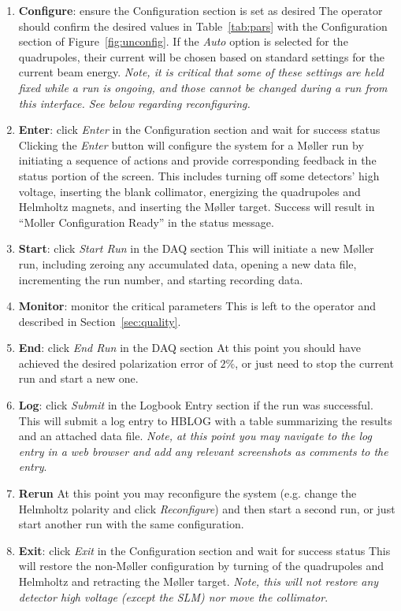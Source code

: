 \documentclass[amsmath,amssymb,notitlepage,12pt]{revtex4}
\begin{document}
\begin{enumerate}
\item {\bf Configure}:  ensure the Configuration section is set as desired
        \subitem
        The operator should confirm the desired values in Table~\ref{tab:pars} with the Configuration section of Figure~\ref{fig:unconfig}.  If the {\em Auto} option is selected for the quadrupoles, their current will be chosen based on standard settings for the current beam energy.  {\em Note, it is critical that some of these settings are held fixed while a run is ongoing, and those cannot be changed during a run from this interface.  See below regarding reconfiguring.}
\item {\bf Enter}: click {\em Enter} in the Configuration section and wait for success status
    \subitem Clicking the {\em Enter} button will configure the system for a M{\o}ller run by initiating a sequence of actions and provide corresponding feedback in the status portion of the screen.  This includes turning off some detectors' high voltage, inserting the blank collimator, energizing the quadrupoles and Helmholtz magnets, and inserting the M{\o}ller target.  Success will result in ``Moller Configuration Ready'' in the status message.
\item {\bf Start}: click {\em Start Run} in the DAQ section
    \subitem This will initiate a new M{\o}ller run, including zeroing any accumulated data, opening a new data file, incrementing the run number, and starting recording data.
\item {\bf Monitor}: monitor the critical parameters
    \subitem This is left to the operator and described in Section~\ref{sec:quality}.
\item {\bf End}: click {\em End Run} in the DAQ section
    \subitem At this point you should have achieved the desired polarization error of $2\%$, or just need to stop the current run and start a new one.
\item {\bf Log}: click {\em Submit} in the Logbook Entry section if the run was successful. 
    \subitem This will submit a log entry to HBLOG with a table summarizing the results and an attached data file. {\em Note, at this point you may navigate to the log entry in a web browser and add any relevant screenshots as comments to the entry}.
\item {\bf Rerun}  At this point you may reconfigure the system (e.g. change the Helmholtz polarity and click {\em Reconfigure}) and then start a second run, or just start another run with the same configuration.
\item {\bf Exit}: click {\em Exit} in the Configuration section and wait for success status
    \subitem  This will restore the non-M{\o}ller configuration by turning of the quadrupoles and Helmholtz and retracting the M{\o}ller target.  {\em Note, this will not restore any detector high voltage (except the SLM) nor move the collimator}. 
\end{enumerate}
\end{document}
